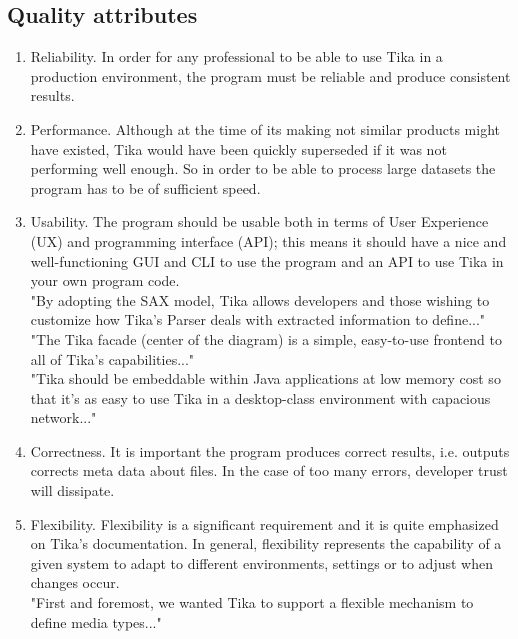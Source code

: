 \documentclass{article}
\begin{document}
\subsection{Quality attributes}
\begin{enumerate}
    \item Reliability. In order for any professional to be able to use Tika in a production environment, the program must be reliable and produce consistent results.
    \item Performance. Although at the time of its making not similar products might have existed, Tika would have been quickly superseded if it was not performing well enough. So in order to be able to process large datasets the program has to be of sufficient speed.
    \item Usability. The program should be usable both in terms of User Experience (UX) and programming interface (API); this means it should have a nice and well-functioning GUI and CLI to use the program and an API to use Tika in your own program code.\\
    
    "By adopting the SAX model, Tika allows developers and those wishing to customize how Tika’s Parser deals with extracted information to define..."\\
    
    "The Tika facade (center of the diagram) is a simple, easy-to-use frontend to all of Tika’s capabilities..."\\
    
    "Tika should be embeddable within Java applications at low memory cost so that it’s as easy to use Tika in a desktop-class environment with capacious network..."\\
    
    \item Correctness. It is important the program produces correct results, i.e. outputs corrects meta data about files. In the case of too many errors, developer trust will dissipate.
    \item Flexibility. Flexibility is a significant requirement and it is quite emphasized on Tika's documentation. In general, flexibility represents the capability of a given system to adapt to different environments, settings or to adjust when changes occur.\\
    
    "First and foremost, we wanted Tika to support a flexible mechanism to define media types..."\\
    

\end{enumerate}
\end{document}
